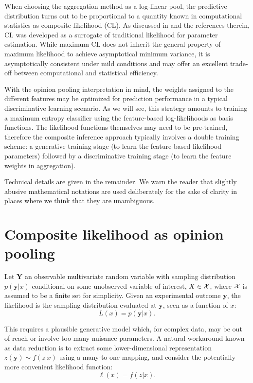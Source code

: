\documentclass[english]{scrartcl}
\def\y{{\mathbf{y}}}
\begin{document}

When choosing the aggregation method as a log-linear pool, the predictive distribution turns out to be proportional to a quantity known in computational statistics as composite likelihood (CL). As discussed in \cite{Varin-11} and the references therein, CL was developed as a surrogate of traditional likelihood for parameter estimation. While maximum CL does not inherit the general property of maximum likelihood to achieve asymptotical minimum variance, it is asymptotically consistent under mild conditions \cite{Xu-11} and may offer an excellent trade-off between computational and statistical efficiency.

With the opinion pooling interpretation in mind, the weights assigned to the different features may be optimized for prediction performance in a typical discriminative learning scenario. As we will see, this strategy amounts to training a maximum entropy classifier using the feature-based log-likelihoods as basis functions. The likelihood functions themselves may need to be pre-trained, therefore the composite inference approach typically involves a double training scheme: a generative training stage (to learn the feature-based likelihood parameters) followed by a discriminative training stage (to learn the feature weights in aggregation).

Technical details are given in the remainder. We warn the reader that slightly abusive mathematical notations are used deliberately for the sake of clarity in places where we think that they are unambiguous.


\section{Composite likelihood as opinion pooling}
\label{sec:log_pool}

Let $\mathbf{Y}$ an observable multivariate random variable with sampling distribution $p(\y|x)$ conditional on some unobserved variable of interest, $X\in{\cal X}$, where ${\cal X}$ is assumed to be a finite set for simplicity. Given an experimental outcome $\y$, the likelihood is the sampling distribution evaluated at $\y$, seen as a function of $x$:
$$
L(x) = p(\y|x)
.
$$

This requires a plausible generative model which, for complex data, may be out of reach or involve too many nuisance parameters. A natural workaround known as data reduction is to extract some lower-dimensional representation $z(\y)\sim f(z|x)$ using a many-to-one mapping, and consider the potentially more convenient likelihood function:
$$
\ell(x) = f(z|x)
.
$$
\end{document}
